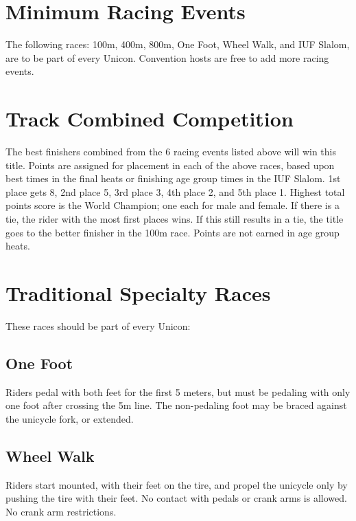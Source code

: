 \section{Minimum Racing Events \label{sec:racing_minimum-racing-events}}
The following races: 100m, 400m, 800m, One Foot, Wheel Walk, and IUF Slalom, are to be part of every Unicon.
Convention hosts are free to add more racing events.

\section{Track Combined Competition}
The best finishers combined from the 6 racing events listed above will win this title.
Points are assigned for placement in each of the above races, based upon best times in the final heats or finishing age group times in the IUF Slalom.
1st place gets 8, 2nd place 5, 3rd place 3, 4th place 2, and 5th place 1.
Highest total points score is the World Champion; one each for male and female.
If there is a tie, the rider with the most first places wins.
If this still results in a tie, the title goes to the better finisher in the 100m race.
Points are not earned in age group heats.

\section{Traditional Specialty Races}
These races should be part of every Unicon: 
\subsection{One Foot}
Riders pedal with both feet for the first 5 meters, but must be pedaling with only one foot after crossing the 5m line.
The non-pedaling foot may be braced against the unicycle fork, or extended.

\subsection{Wheel Walk}
Riders start mounted, with their feet on the tire, and propel the unicycle only by pushing the tire with their feet.
No contact with pedals or crank arms is allowed.
No crank arm restrictions.

